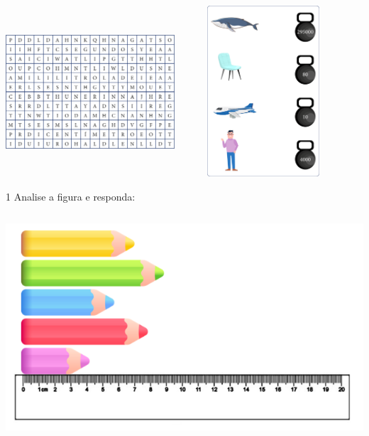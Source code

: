 {\includegraphics[width=2.47525in,height=2.47010in]{media/image40.png}
\includegraphics[width=2.51046in,height=2.50000in]{media/image41.png}
}


\num{1} Analise a figura e responda:


\includegraphics[width=5.76042in,height=3.32424in]{media/image42.png}

